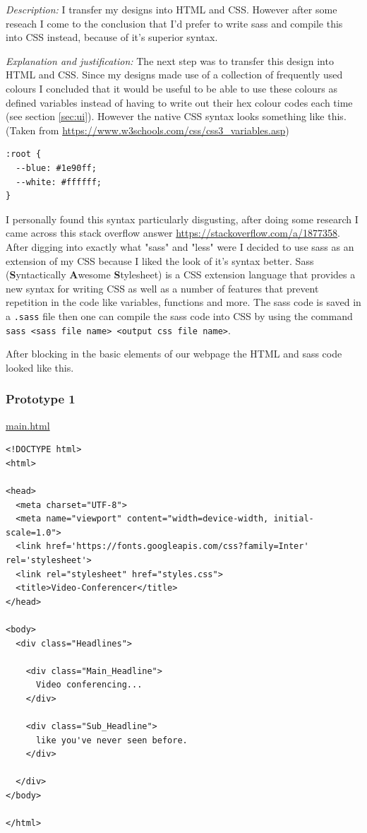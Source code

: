 \textit{Description:}
I transfer my designs into HTML and CSS. However after some 
reseach I come to the conclusion that I'd prefer to write 
sass and compile this into CSS instead, because of it's 
superior syntax. \\ \vspace{0.2cm}

\textit{Explanation and justification:}
The next step was to transfer this design into HTML and CSS. 
Since my designs made use of a collection of frequently used 
colours I concluded that it would be useful to be able to use
these colours as defined variables instead of having to write 
out their hex colour codes each time 
(see section \ref{sec:ui}). However the native CSS syntax 
looks something like this. (Taken from \url{https://www.w3schools.com/css/css3_variables.asp})

\begin{verbatim}
:root {
  --blue: #1e90ff;
  --white: #ffffff;
}
\end{verbatim}

I personally found this syntax particularly disgusting, 
after doing some research I came across this stack overflow 
answer \url{https://stackoverflow.com/a/1877358}. After digging
into exactly what "sass" and "less" were I decided to use sass
as an extension of my CSS because I liked the look of it's 
syntax better. Sass (\textbf{S}yntactically \textbf{A}wesome 
\textbf{S}tylesheet) is a CSS extension language that 
provides a new syntax for writing CSS as well as a number of 
features that prevent repetition in the code like variables, 
functions and more. The sass code is saved in a \texttt{.sass}
file then one can compile the sass code into CSS by using the
command \texttt{sass <sass file name> <output css file name>}.
\\ \vspace{0.2cm}

After blocking in the basic elements of our webpage the HTML 
and sass code looked like this.

\subsubsection{Prototype 1}

\underline{main.html}

\begin{verbatim}
<!DOCTYPE html>
<html>

<head>
  <meta charset="UTF-8">
  <meta name="viewport" content="width=device-width, initial-scale=1.0">
  <link href='https://fonts.googleapis.com/css?family=Inter' rel='stylesheet'>
  <link rel="stylesheet" href="styles.css">
  <title>Video-Conferencer</title>
</head>

<body>
  <div class="Headlines">

    <div class="Main_Headline">
      Video conferencing...
    </div>

    <div class="Sub_Headline">
      like you've never seen before.
    </div>

  </div>
</body>

</html>
\end{verbatim}


